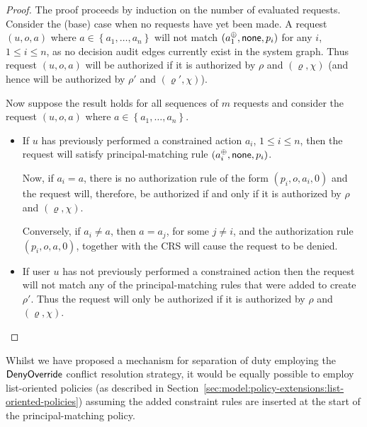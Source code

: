 \documentclass{article}
\newcommand{\set}[1]{\ensuremath{\left\{#1\right\}}} \newcommand{\setO}[1]{\ensuremath{\left\{#1\right.}} \newcommand{\setC}[1]{\ensuremath{\left.#1\right\}}} \newcommand{\setN}[1]{\ensuremath{\left.#1\right.}} \newcommand{\sett}[1]{\ensuremath{\left\{\textit{#1}\right\}}} \newcommand{\tuple}[1]{\ensuremath{\left(#1\right)}} \newcommand{\tuplet}[1]{\ensuremath{\left(\textit{#1}\right)}} \newcommand{\card}[1]{\left| #1 \right|}
\begin{document}
\begin{proof}
    The proof proceeds by induction on the number of evaluated requests.
    Consider the (base) case when no requests have yet been made.
    A request $(u,o,a)$ where $a \in \set{a_1, \dots, a_n}$ will not match $(a_1^\oplus,\mathsf{none},p_i)$ for any $i$, $1 \leqslant i \leqslant n$, as no decision audit edges currently exist in the system graph.
    Thus request $(u,o,a)$ will be authorized if it is authorized by $\rho$ and $(\varrho, \chi)$ (and hence will be authorized by $\rho'$ and $(\varrho',\chi)$).

    Now suppose the result holds for all sequences of $m$ requests and consider the request $(u,o,a)$ where $a \in \set{a_1, \dots, a_n}$.
    \begin{itemize}
        \item If $u$ has previously performed a constrained action $a_i$, $1 \leqslant i \leqslant n$, then the request will satisfy principal-matching rule $(a_i^\oplus, \mathsf{none}, p_i)$.
	
	      Now, if $a_i = a$, there is no authorization rule of the form $(p_i,o,a_i,0)$ and the request will, therefore, be authorized if and only if it is authorized by $\rho$ and $(\varrho, \chi)$.
	
	      Conversely, if $a_i \ne a$, then $a = a_j$, for some $j \ne i$, and the authorization rule $(p_i, o, a, 0)$, together with the  CRS will cause the request to be denied.
        \item If user $u$ has not previously performed a constrained action then the request will not match any of the principal-matching rules that were added to create $\rho'$.
	      Thus the request will only be authorized if it is authorized by $\rho$ and $(\varrho, \chi)$.
    \end{itemize}
\end{proof}

Whilst we have proposed a mechanism for separation of duty employing the $\textsf{DenyOverride}$ conflict resolution strategy, it would be equally possible to employ list-oriented policies (as described in Section~\ref{sec:model:policy-extensions:list-oriented-policies}) assuming the added constraint rules are inserted at the start of the principal-matching policy.
\end{document}
